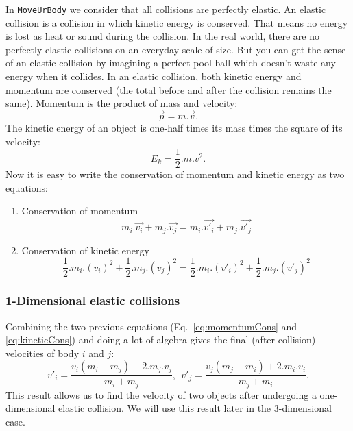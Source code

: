 In \texttt{MoveUrBody} we consider that all collisions are perfectly elastic.
An elastic collision is a collision in which kinetic energy is conserved. 
That means no energy is lost as heat or sound during the collision. 
In the real world, there are no perfectly elastic collisions on an everyday scale of size. 
But you can get the sense of an elastic collision by imagining a perfect pool ball which doesn't waste any energy when it collides. 
In an elastic collision, both kinetic energy and momentum are conserved (the total before and after the collision remains the same).
Momentum is the product of mass and velocity: 
\begin{equation}	
\label{eq:momentum}
	\vec{p} = m . \vec{v}.
\end{equation}
The kinetic energy of an object is one-half times its mass times the square of its velocity:
\begin{equation}	
\label{eq:kinetic}
	E_k = \frac{1}{2} . m . v^2.
\end{equation}
Now it is easy to write the conservation of momentum and kinetic energy as two equations:
\begin{enumerate}
	\item Conservation of momentum
		\begin{equation}	
		\label{eq:momentumCons}
			m_i . \vec{v_i} + m_j . \vec{v_j} = m_i . \vec{v'_i} + m_j . \vec{v'_j}
		\end{equation}
		
	\item Conservation of kinetic energy
		\begin{equation}	
		\label{eq:kineticCons}
			\frac{1}{2} . m_i . (v_i)^2 + \frac{1}{2} . m_j . (v_j)^2 = \frac{1}{2} . m_i . (v'_i)^2 + \frac{1}{2} . m_j . (v'_j)^2
		\end{equation}
\end{enumerate}

\subsubsection{1-Dimensional elastic collisions}
Combining the two previous equations (Eq.~\ref{eq:momentumCons} and \ref{eq:kineticCons}) and doing a lot of algebra gives the final (after collision) velocities of body $i$ and $j$:
\begin{equation}	
\label{eq:1DelasticSols}
	v'_i = \frac{v_i(m_i-m_j) + 2.m_j.v_j}{m_i + m_j},~~v'_j = \frac{v_j(m_j-m_i) + 2.m_i.v_i}{m_j + m_i}.
\end{equation}
This result allows us to find the velocity of two objects after undergoing a one-dimensional elastic collision. 
We will use this result later in the 3-dimensional case.

